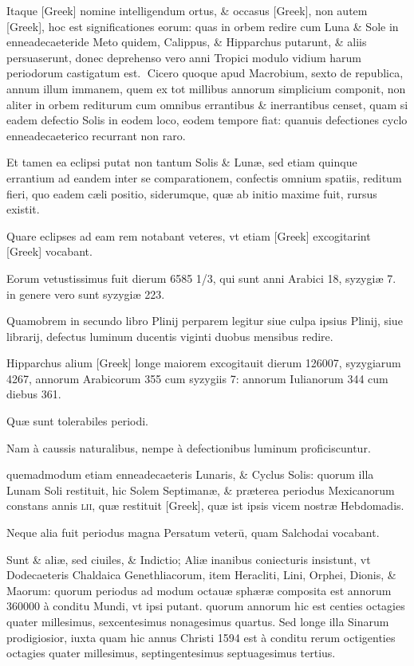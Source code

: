 \begin{parnumbers}

Itaque \textgreek{[Greek]} nomine intelligendum ortus, \& occasus \textgreek{[Greek]},  non autem \textgreek{[Greek]}, hoc est significationes eorum: quas in orbem redire cum Luna \& Sole in enneadecaeteride Meto quidem, Calippus, \& Hipparchus putarunt, \& aliis persuaserunt, donec deprehenso vero anni Tropici modulo vidium harum periodorum castigatum est.
Cicero quoque apud Macrobium, sexto de republica, annum illum immanem, quem ex tot millibus annorum simplicium componit, non aliter in orbem rediturum cum omnibus errantibus \& inerrantibus censet, quam si eadem defectio Solis in eodem loco, eodem tempore fiat: quanuis defectiones cyclo enneadecaeterico recurrant non raro.

Et tamen ea eclipsi putat non tantum Solis \& Lunæ, sed etiam quinque errantium ad eandem  inter se comparationem, confectis omnium spatiis, reditum fieri, quo eadem cæli positio, siderumque, quæ ab initio maxime fuit, rursus existit.

Quare eclipses ad eam rem notabant veteres, vt etiam \textgreek{[Greek]} excogitarint \textgreek{[Greek]} vocabant.

Eorum vetustissimus fuit dierum 6585 1/3, qui sunt anni Arabici 18, syzygiæ 7. in genere vero sunt syzygiæ 223.

Quamobrem in secundo libro Plinij perparem legitur siue culpa ipsius Plinij, siue librarij, defectus luminum ducentis viginti duobus mensibus redire.

Hipparchus alium \textgreek{[Greek]} longe maiorem excogitauit dierum 126007, syzygiarum 4267, annorum Arabicorum 355 cum syzygiis 7: annorum Iulianorum 344 cum diebus 361.

Quæ sunt tolerabiles periodi.

Nam à caussis naturalibus,  nempe à defectionibus luminum proficiscuntur.

quemadmodum etiam enneadecaeteris Lunaris, \& Cyclus Solis: quorum illa Lunam Soli restituit, hic Solem Septimanæ, \& præterea periodus Mexicanorum constans annis \textsc{lii}, quæ restituit \textgreek{[Greek]}, quæ ist ipsis vicem nostræ Hebdomadis.

Neque alia fuit periodus magna Persatum veterū, quam Salchodai vocabant.

Sunt \& aliæ, sed ciuiles, \& Indictio; Aliæ inanibus coniecturis insistunt, vt Dodecaeteris Chaldaica Genethliacorum, item Heracliti, Lini, Orphei, Dionis, \& Maorum: quorum periodus ad modum octauæ sphæræ composita est annorum 360000 à conditu Mundi, vt ipsi putant. quorum annorum hic est centies octagies quater millesimus, sexcentesimus nonagesimus quartus.  Sed longe illa Sinarum prodigiosior, iuxta quam hic annus Christi 1594 est à conditu rerum octigenties octagies quater millesimus, septingentesimus septuagesimus tertius.


\end{parnumbers}
